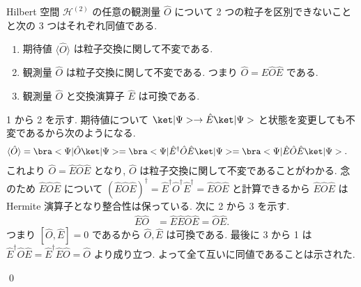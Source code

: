 \documentclass[uplatex,dvipdfmx,a4paper,11pt]{jlreq}
\makeatletter
\newcommand{\HH}{\mathcal{H}}
\numberwithin{equation}{section}
\theoremstyle{definition}
\renewenvironment{proof}[1][\proofname]{\par
  \normalfont
  \topsep6\p@\@plus6\p@ \trivlist
  \item[\hskip\labelsep{\bfseries #1}\@addpunct{\bfseries}]\ignorespaces\quad\par
}{
  \qed\endtrivlist\@endpefalse
}
\renewcommand\proofname{証明}
\makeatother
\begin{document}
\begin{proposition}
  Hilbert 空間 $\HH^{(2)}$ の任意の観測量 $\hat{O}$ について 2 つの粒子を区別できないことと次の 3 つはそれぞれ同値である.
  \begin{enumerate}
    \item 期待値 $\langle\hat{O}\rangle$ は粒子交換に関して不変である.
    \item 観測量 $\hat{O}$ は粒子交換に関して不変である. つまり $\hat{O} = \hat{E}\hat{O}\hat{E}$ である.
    \item 観測量 $\hat{O}$ と交換演算子 $\hat{E}$ は可換である.
  \end{enumerate}
\end{proposition}
\begin{proof}
  1 から 2 を示す. 期待値について $\ket|\Psi> \to \hat{E}\ket|\Psi>$ と状態を変更しても不変であるから次のようになる.
  \begin{align}
    \langle\hat{O}\rangle & = \bra<\Psi|\hat{O}\ket|\Psi> = \bra<\Psi|\hat{E}^\dagger\hat{O}\hat{E}\ket|\Psi> = \bra<\Psi|\hat{E}\hat{O}\hat{E}\ket|\Psi>.
  \end{align}
  これより $\hat{O} = \hat{E}\hat{O}\hat{E}$ となり, $\hat{O}$ は粒子交換に関して不変であることがわかる.
  念のため $\hat{E}\hat{O}\hat{E}$ について $(\hat{E}\hat{O}\hat{E})^\dagger = \hat{E}^\dagger\hat{O}^\dagger\hat{E}^\dagger = \hat{E}\hat{O}\hat{E}$ と計算できるから $\hat{E}\hat{O}\hat{E}$ は Hermite 演算子となり整合性は保っている.
  次に 2 から 3 を示す.
  \begin{align}
    \hat{E}\hat{O} & = \hat{E}\hat{E}\hat{O}\hat{E} = \hat{O}\hat{E}.
  \end{align}
  つまり $[\hat{O}, \hat{E}] = 0$ であるから $\hat{O}, \hat{E}$ は可換である.
  最後に 3 から 1 は $\hat{E}^\dagger\hat{O}\hat{E} = \hat{E}^\dagger\hat{E}\hat{O} = \hat{O}$ より成り立つ.
  よって全て互いに同値であることは示された.
\end{proof}
\end{document}
